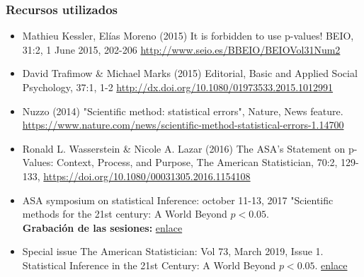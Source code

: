 \documentclass[9pt]{beamer}
\begin{document}
\begin{frame}
  \frametitle{Recursos utilizados}
  \begin{itemize}
  \item Mathieu Kessler, Elías Moreno (2015) It is forbidden to use p-values!  BEIO, 31:2, 1 June 2015, 202-206
\href{http://www.seio.es/BBEIO/BEIOVol31Num2}{http://www.seio.es/BBEIO/BEIOVol31Num2}

\item David Trafimow \& Michael Marks (2015) Editorial, Basic and Applied Social Psychology, 37:1, 1-2 \href{http://dx.doi.org/10.1080/01973533.2015.1012991}{http://dx.doi.org/10.1080/01973533.2015.1012991}

\item Nuzzo (2014) "Scientific method: statistical errors", Nature, News feature. \href{https://www.nature.com/news/scientific-method-statistical-errors-1.14700}{https://www.nature.com/news/scientific-method-statistical-errors-1.14700}

  \item Ronald L. Wasserstein \& Nicole A. Lazar (2016) The ASA's Statement on p-Values: Context, Process, and Purpose, The American Statistician, 70:2, 129-133,  \href{https://doi.org/10.1080/00031305.2016.1154108}{https://doi.org/10.1080/00031305.2016.1154108}

  \item ASA symposium on statistical Inference: october 11-13, 2017
    "Scientific methods for the 21st century: A World Beyond $p < 0.05$.\\ 
\textbf{Grabación de las sesiones:}
\href{http://ww2.amstat.org/meetings/ssi/2017/recordedsessions.cfm}{enlace}

\item Special issue The American Statistician:  Vol 73, March 2019, Issue 1.
Statistical Inference in the 21st Century: A World Beyond $p < 0.05$. \href{https://www.tandfonline.com/toc/utas20/73/sup1}{enlace}
\end{itemize}
\end{frame}
\end{document}
